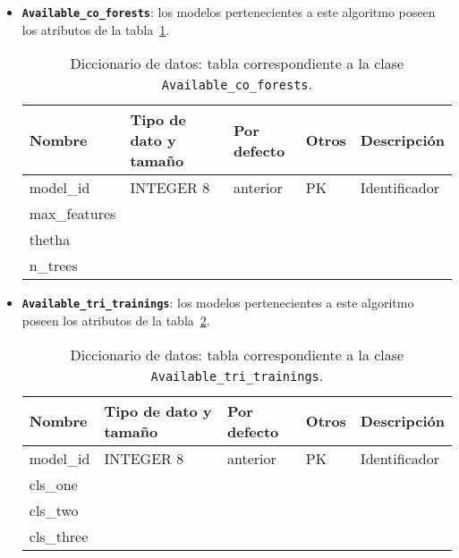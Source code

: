 \begin{itemize}
	\item \textbf{\texttt{Available\_co\_forests}}: los modelos pertenecientes a este algoritmo poseen los atributos de la tabla~\ref{datadic:coforest}.
	
	\begin{table}
		\small
		\begin{centering}
			\begin{tabular}{@{}p{6em} p{6em} p{6em} p{6em} p{6em}@{}}
				\toprule
				\textbf{Nombre} & \textbf{Tipo de dato y tamaño} & \textbf{Por defecto}& \textbf{Otros} & \textbf{Descripción}\\
				\midrule
				model\_id & INTEGER 8 & anterior & PK & Identificador \\
				max\_features &  &  &  &  \\
				thetha &  &  &  &   \\
				n\_trees &  &  &  &   \\
				\bottomrule
			\end{tabular}
		\end{centering}
		\caption[Diccionario de datos: Available\_co\_forests]{Diccionario de datos: tabla correspondiente a la clase \texttt{Available\_co\_forests}.}
		\label{datadic:coforest}
	\end{table}

	\item \textbf{\texttt{Available\_tri\_trainings}}: los modelos pertenecientes a este algoritmo poseen los atributos de la tabla~\ref{datadic:tritraining}.

	\begin{table}
		\small
		\begin{centering}
			\begin{tabular}{@{}p{6em} p{6em} p{6em} p{6em} p{6em}@{}}
				\toprule
				\textbf{Nombre} & \textbf{Tipo de dato y tamaño} & \textbf{Por defecto}& \textbf{Otros} & \textbf{Descripción}\\
				\midrule
				model\_id & INTEGER 8 & anterior & PK & Identificador \\
				cls\_one &  &  &  &  \\
				cls\_two &  &  &  &   \\
				cls\_three &  &  &  &   \\
				\bottomrule
			\end{tabular}
		\end{centering}
		\caption[Diccionario de datos: Available\_tri\_trainings]{Diccionario de datos: tabla correspondiente a la clase \texttt{Available\_tri\_trainings}.}
		\label{datadic:tritraining}
	\end{table}


\end{itemize}
